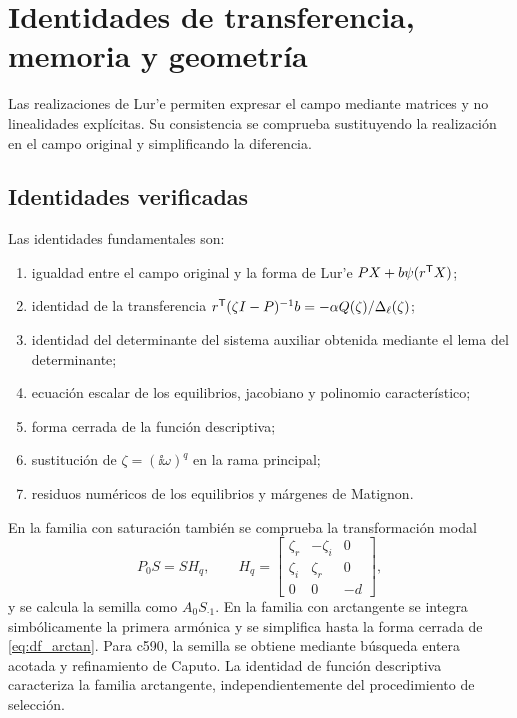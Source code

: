 \section{Identidades de transferencia, memoria y geometría}
\label{app:wolfram}

Las realizaciones de Lur'e permiten expresar el campo mediante matrices y
no linealidades explícitas. Su consistencia se comprueba sustituyendo la
realización en el campo original y simplificando la diferencia.

\subsection{Identidades verificadas}

Las identidades fundamentales son:
\begin{enumerate}
 \item igualdad entre el campo original y la forma de Lur'e
 \(PX+b\psi(r^{\mathsf T}X)\);
 \item identidad de la transferencia
\(r^{\mathsf T}(\zeta I-P)^{-1}b=-\alpha Q(\zeta)/\Delta_\ell(\zeta)\);
 \item identidad del determinante del sistema auxiliar obtenida mediante el
 lema del determinante;
 \item ecuación escalar de los equilibrios, jacobiano y polinomio
 característico;
 \item forma cerrada de la función descriptiva;
 \item sustitución de \(\zeta=(\ii\omega)^q\) en la rama principal;
 \item residuos numéricos de los equilibrios y márgenes de Matignon.
\end{enumerate}

En la familia con saturación también se comprueba la transformación modal
\begin{equation}
P_0S=SH_q,\qquad
H_q=
\begin{bmatrix}
\zeta_r&-\zeta_i&0\\
\zeta_i& \zeta_r&0\\
0&0&-d
\end{bmatrix},
\label{eq:wolfram_similitud}
\end{equation}
y se calcula la semilla como \(A_0S_{\cdot1}\). En la familia con arctangente
se integra simbólicamente la primera armónica y se simplifica hasta la forma
cerrada de \cref{eq:df_arctan}. Para c590, la semilla se obtiene mediante búsqueda entera acotada y
refinamiento de Caputo. La identidad de función descriptiva caracteriza la
familia arctangente, independientemente del procedimiento de selección.

